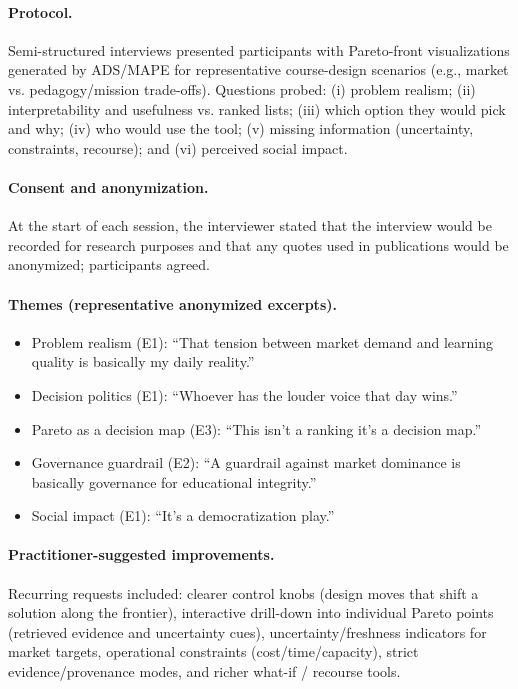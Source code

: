 \documentclass[sigconf,review]{acmart}
\newcommand{\ADS}{\textsc{ADS}\xspace}
\newcommand{\MAPE}{\textsc{MAPE}\xspace}
\begin{document}
\paragraph{Protocol.} Semi-structured interviews presented participants with Pareto-front visualizations generated by \ADS/\MAPE for representative course-design scenarios (e.g., market vs. pedagogy/mission trade-offs). Questions probed: (i) problem realism; (ii) interpretability and usefulness vs. ranked lists; (iii) which option they would pick and why; (iv) who would use the tool; (v) missing information (uncertainty, constraints, recourse); and (vi) perceived social impact.

\paragraph{Consent and anonymization.} At the start of each session, the interviewer stated that the interview would be recorded for research purposes and that any quotes used in publications would be anonymized; participants agreed.

\paragraph{Themes (representative anonymized excerpts).}
\begin{itemize}
  \item {Problem realism (E1):} ``That tension between market demand and learning quality is basically my daily reality.''
  \item {Decision politics (E1):} ``Whoever has the louder voice that day wins.''
  \item {Pareto as a decision map (E3):} ``This isn't a ranking it's a decision map.''
  \item {Governance guardrail (E2):} ``A guardrail against market dominance is basically governance for educational integrity.''
  \item {Social impact (E1):} ``It's a democratization play.''
\end{itemize}

\paragraph{Practitioner-suggested improvements.} Recurring requests included: clearer control knobs (design moves that shift a solution along the frontier), interactive drill-down into individual Pareto points (retrieved evidence and uncertainty cues), uncertainty/freshness indicators for market targets, operational constraints (cost/time/capacity), strict evidence/provenance modes, and richer what-if / recourse tools.
\end{document}
